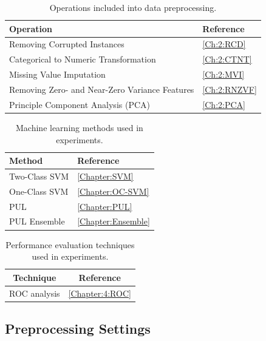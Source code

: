 \begin{table}[ht!]
\centering
 \begin{tabular}{|l|l|}\hline
  Operation&Reference\\ \hline
 Removing Corrupted Instances  & \ref{Ch:2:RCD} \\ \hline
        Categorical to Numeric Transformation & \ref{Ch:2:CTNT} \\
     \hline 
      Missing Value Imputation & \ref{Ch:2:MVI} \\
     \hline 
     Removing Zero- and Near-Zero Variance Features  & \ref{Ch:2:RNZVF} \\
     \hline 
     Principle Component Analysis (PCA) & \ref{Ch:2:PCA} \\
     \hline 
        \end{tabular}
\caption{Operations included into data preprocessing.}
\label{tab:data-pred-methods} 
\end{table}

\begin{table}[ht!]
\centering
 \begin{tabular}{|l|l|}\hline
         Method & Reference\\
        \hline
        Two-Class SVM & \ref{Chapter:SVM} \\
        \hline
        One-Class SVM & \ref{Chapter:OC-SVM} \\
        \hline
        PUL &  \ref{Chapter:PUL} \\
        \hline
        PUL Ensemble &  \ref{Chapter:Ensemble} \\
        \hline
    \end{tabular}
 \caption{Machine learning methods used in experiments.}
\label{tab:machine-learn-tech} 
\end{table}

\begin{table}[ht!]
    \centering
        \begin{tabular}{|c|c|}
        \hline
        Technique&Reference\\
        \hline
        ROC analysis & \ref{Chapter:4:ROC} \\
        \hline
        \end{tabular}
        \caption{Performance evaluation techniques used in experiments.}
    \label{tab:res-ev}
\end{table}



\subsection{Preprocessing Settings}\label{ch:prepro:setting}

